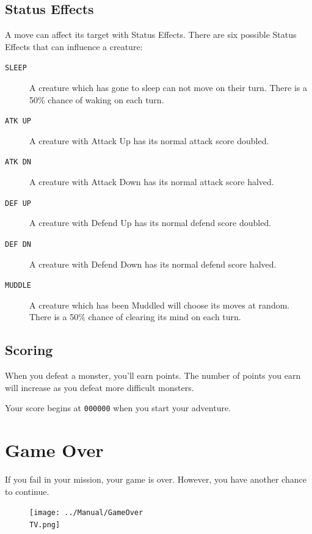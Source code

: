 \documentclass[10pt,twocolumn,openany,article]{memoir}
\newcommand\TV{NTSC}
\newcommand\TV{PAL}
\newcommand\TV{SECAM}
\begin{document}
\begin{description}
\subsection{Status Effects}

A move can affect its target with Status Effects. There are six possible
Status Effects that can influence a creature:

\begin{description}
\item[\texttt{SLEEP}] A creature which has gone to sleep can not move on
  their turn. There is a 50\% chance of waking on each turn.
\item[\texttt{ATK UP}] A  creature with Attack Up has  its normal attack
  score doubled.
\item[\texttt{ATK DN}] A creature with Attack Down has its normal attack
  score halved.
\item[\texttt{DEF UP}] A  creature with Defend Up has  its normal defend
  score doubled.
\item[\texttt{DEF DN}] A creature with Defend Down has its normal defend
  score halved.
\item[\texttt{MUDDLE}] A creature which has been Muddled will choose its
  moves at random. There is a 50\% chance of clearing its mind on each turn.
\end{description}

\subsection{Scoring}

When you  defeat a monster, you'll  earn points. The number  of points
you earn will increase as you defeat more difficult monsters.

Your score begins at \texttt{000000} when you start your adventure.

\section{Game Over}

If  you fail  in your  mission,  your game  is over.  However, you  have
another chance to continue.

\begin{figure}[b]
  \begin{center}
    \texttt{[image: ../Manual/GameOver\\TV.png]}
  \end{center}
\end{figure}


\end{description}
\end{document}
